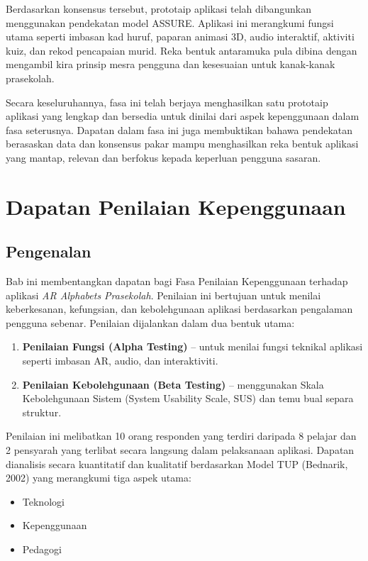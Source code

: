 {{Berdasarkan konsensus tersebut, prototaip aplikasi telah dibangunkan menggunakan pendekatan model ASSURE. Aplikasi ini merangkumi fungsi utama seperti imbasan kad huruf, paparan animasi 3D, audio interaktif, aktiviti kuiz, dan rekod pencapaian murid. Reka bentuk antaramuka pula dibina dengan mengambil kira prinsip mesra pengguna dan kesesuaian untuk kanak-kanak prasekolah.

Secara keseluruhannya, fasa ini telah berjaya menghasilkan satu prototaip aplikasi yang lengkap dan bersedia untuk dinilai dari aspek kepenggunaan dalam fasa seterusnya. Dapatan dalam fasa ini juga membuktikan bahawa pendekatan berasaskan data dan konsensus pakar mampu menghasilkan reka bentuk aplikasi yang mantap, relevan dan berfokus kepada keperluan pengguna sasaran.

\chapter{Dapatan Penilaian Kepenggunaan}

\section{Pengenalan}

Bab ini membentangkan dapatan bagi Fasa Penilaian Kepenggunaan terhadap aplikasi \textit{AR Alphabets Prasekolah}. Penilaian ini bertujuan untuk menilai keberkesanan, kefungsian, dan kebolehgunaan aplikasi berdasarkan pengalaman pengguna sebenar. Penilaian dijalankan dalam dua bentuk utama:

\begin{enumerate}
  \item \textbf{Penilaian Fungsi (Alpha Testing)} – untuk menilai fungsi teknikal aplikasi seperti imbasan AR, audio, dan interaktiviti.
  \item \textbf{Penilaian Kebolehgunaan (Beta Testing)} – menggunakan Skala Kebolehgunaan Sistem (System Usability Scale, SUS) dan temu bual separa struktur.
\end{enumerate}

Penilaian ini melibatkan 10 orang responden yang terdiri daripada 8 pelajar dan 2 pensyarah yang terlibat secara langsung dalam pelaksanaan aplikasi. Dapatan dianalisis secara kuantitatif dan kualitatif berdasarkan Model TUP (Bednarik, 2002) yang merangkumi tiga aspek utama:

\begin{itemize}
  \item Teknologi
  \item Kepenggunaan
  \item Pedagogi
\end{itemize}

}}
